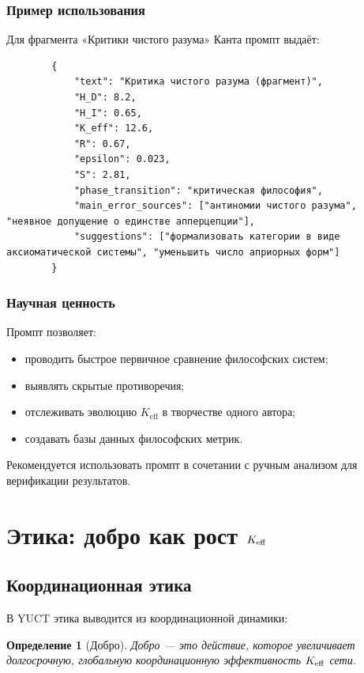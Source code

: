 \documentclass[12pt,a4paper]{article}
\newtheorem{definition}{Определение}[section]
\begin{document}
	\subsubsection{Пример использования}
	
	Для фрагмента «Критики чистого разума» Канта промпт выдаёт:
	
	\begin{verbatim}
		{
			"text": "Критика чистого разума (фрагмент)",
			"H_D": 8.2,
			"H_I": 0.65,
			"K_eff": 12.6,
			"R": 0.67,
			"epsilon": 0.023,
			"S": 2.81,
			"phase_transition": "критическая философия",
			"main_error_sources": ["антиномии чистого разума", "неявное допущение о единстве апперцепции"],
			"suggestions": ["формализовать категории в виде аксиоматической системы", "уменьшить число априорных форм"]
		}
	\end{verbatim}
	
	\subsubsection{Научная ценность}
	
	Промпт позволяет:
	\begin{itemize}
		\item проводить быстрое первичное сравнение философских систем;
		\item выявлять скрытые противоречия;
		\item отслеживать эволюцию \(K_{\mathrm{eff}}\) в творчестве одного автора;
		\item создавать базы данных философских метрик.
	\end{itemize}
	
	Рекомендуется использовать промпт в сочетании с ручным анализом для верификации результатов.
	
	\section{Этика: добро как рост \texorpdfstring{\(\Keff\)}{K\_eff}}
	
	\subsection{Координационная этика}
	
	В YUCT этика выводится из координационной динамики:
	
	\begin{definition}[Добро]
		Добро — это действие, которое увеличивает долгосрочную, глобальную координационную эффективность \(\Keff\) сети.
	\end{definition}
	
\end{document}
